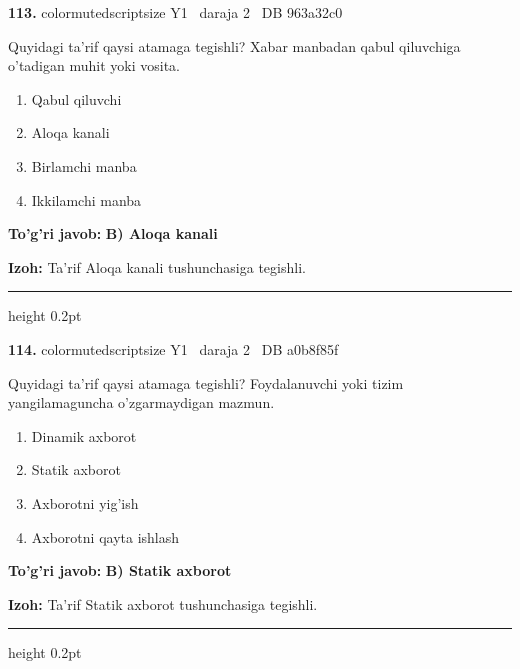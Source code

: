\documentclass[10pt,a4paper,oneside]{article}
\begin{document}
\noindent\textbf{\color{ink}113.}  {color{muted}scriptsize Y1 \textbullet\ daraja 2 \textbullet\ DB 963a32c0}
\par
Quyidagi ta'rif qaysi atamaga tegishli? Xabar manbadan qabul qiluvchiga o'tadigan muhit yoki vosita.
\begin{enumerate}[label=\Alph*),leftmargin=9mm]
\item Qabul qiluvchi
\item Aloqa kanali
\item Birlamchi manba
\item Ikkilamchi manba
\end{enumerate}
\begin{tcolorbox}[enhanced,breakable,colback=teal!4,colframe=teal!50!black,boxrule=0.5pt,arc=1.1mm,left=3mm,right=3mm,top=1.7mm,bottom=1.7mm,before skip=2mm,after skip=2mm]
\textbf{\color{teal}To'g'ri javob:} \textbf{B) Aloqa kanali}
\par\smallskip
\textbf{Izoh:} Ta'rif Aloqa kanali tushunchasiga tegishli.
\end{tcolorbox}
\vspace{2mm}\hrule height 0.2pt \vspace{3mm}

\noindent\textbf{\color{ink}114.}  {color{muted}scriptsize Y1 \textbullet\ daraja 2 \textbullet\ DB a0b8f85f}
\par
Quyidagi ta'rif qaysi atamaga tegishli? Foydalanuvchi yoki tizim yangilamaguncha o'zgarmaydigan mazmun.
\begin{enumerate}[label=\Alph*),leftmargin=9mm]
\item Dinamik axborot
\item Statik axborot
\item Axborotni yig'ish
\item Axborotni qayta ishlash
\end{enumerate}
\begin{tcolorbox}[enhanced,breakable,colback=teal!4,colframe=teal!50!black,boxrule=0.5pt,arc=1.1mm,left=3mm,right=3mm,top=1.7mm,bottom=1.7mm,before skip=2mm,after skip=2mm]
\textbf{\color{teal}To'g'ri javob:} \textbf{B) Statik axborot}
\par\smallskip
\textbf{Izoh:} Ta'rif Statik axborot tushunchasiga tegishli.
\end{tcolorbox}
\vspace{2mm}\hrule height 0.2pt \vspace{3mm}
\end{document}
